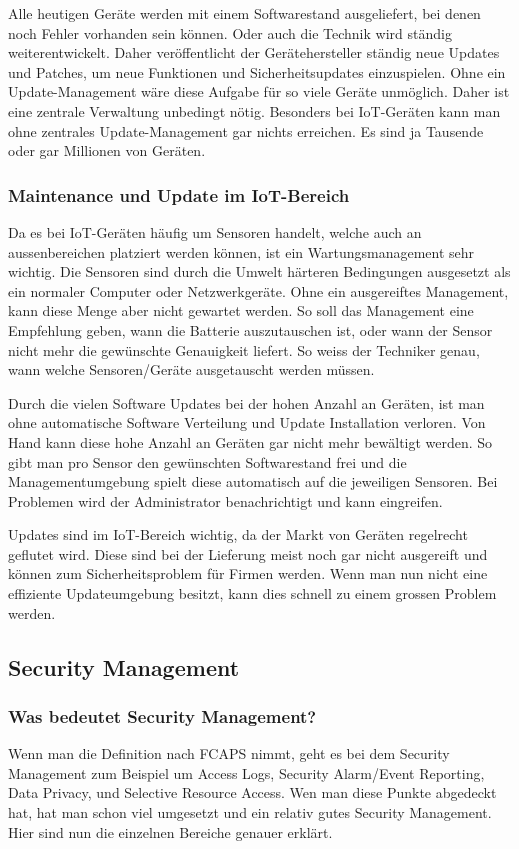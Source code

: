 Alle heutigen Geräte werden mit einem Softwarestand ausgeliefert, bei denen noch Fehler vorhanden sein können. Oder auch die Technik wird ständig weiterentwickelt. Daher veröffentlicht der Gerätehersteller ständig neue Updates und Patches, um neue Funktionen und Sicherheitsupdates einzuspielen. Ohne ein Update-Management wäre diese Aufgabe für so viele Geräte unmöglich. Daher ist eine zentrale Verwaltung unbedingt nötig. Besonders bei IoT-Geräten kann man ohne zentrales Update-Management gar nichts erreichen. Es sind ja Tausende oder gar Millionen von Geräten.
\subsubsection{Maintenance und Update im IoT-Bereich}
Da es bei IoT-Geräten häufig um Sensoren handelt, welche auch an aussenbereichen platziert werden können, ist ein Wartungsmanagement sehr wichtig. Die Sensoren sind durch die Umwelt härteren Bedingungen ausgesetzt als ein normaler Computer oder Netzwerkgeräte. Ohne ein ausgereiftes Management, kann diese Menge aber nicht gewartet werden. So soll das Management eine Empfehlung geben, wann die Batterie auszutauschen ist, oder wann der Sensor nicht mehr die gewünschte Genauigkeit liefert. So weiss der Techniker genau, wann welche Sensoren/Geräte ausgetauscht werden müssen.

Durch die vielen Software Updates bei der hohen Anzahl an Geräten, ist man ohne automatische Software Verteilung und Update Installation verloren. Von Hand kann diese hohe Anzahl an Geräten gar nicht mehr bewältigt werden. So gibt man pro Sensor den gewünschten Softwarestand frei und die Managementumgebung spielt diese automatisch auf die jeweiligen Sensoren. Bei Problemen wird der Administrator benachrichtigt und kann eingreifen.

Updates sind im IoT-Bereich wichtig, da der Markt von Geräten regelrecht geflutet wird. Diese sind bei der Lieferung meist noch gar nicht ausgereift und können zum Sicherheitsproblem für Firmen werden. Wenn man nun nicht eine effiziente Updateumgebung besitzt, kann dies schnell zu einem grossen Problem werden.
\subsection{Security Management}
\subsubsection{Was bedeutet Security Management?}
Wenn man die Definition nach FCAPS nimmt, geht es bei dem Security Management zum Beispiel um Access Logs, Security Alarm/Event Reporting, Data Privacy, und Selective Resource Access. Wen man diese Punkte abgedeckt hat, hat man schon viel umgesetzt und ein relativ gutes Security Management. Hier sind nun die einzelnen Bereiche genauer erklärt.

